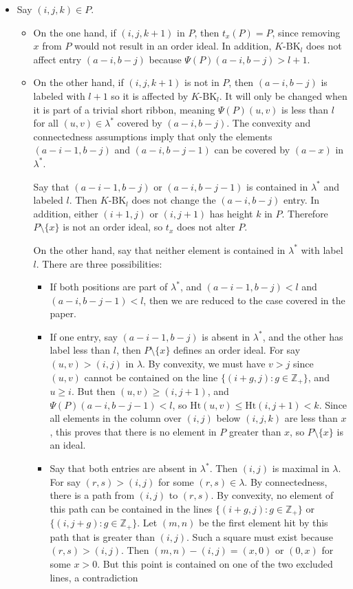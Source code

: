 \documentclass[10pt,letter]{article}
\begin{document}
\begin{itemize}
\item Say $(i,j,k) \in P$. 
\begin{itemize}
\item On the one hand, if $(i,j,k+1)$ in $P$, then $t_x(P) = P$, since removing $x$ from $P$ would not result in an order ideal. In addition, $K$-$\text{BK}_l$ does not affect entry $(a-i,b-j)$ because $\Psi(P)(a-i,b-j) > l + 1$. 

\item On the other hand, if $(i,j,k+1)$ is not in $P$, then $(a-i,b-j)$ is labeled with $l+1$ so it is affected by $K$-$\text{BK}_l$.  It will only be changed when it is part of a trivial short ribbon, meaning $\Psi(P)(u,v)$ is less than $l$ for all $(u,v) \in \lambda^{\ast}$ covered by $(a-i,b-j)$. The convexity and connectedness assumptions imply that only the elements $(a-i-1,b-j)$ and $(a-i,b-j-1)$ can be covered by $(a-x)$ in $\lambda^{\ast}$.

Say that $(a-i-1,b-j)$ or $(a-i,b-j-1)$ is contained in $\lambda^{\ast}$ and labeled $l$. Then $K$-$\text{BK}_l$ does not change the $(a-i,b-j)$ entry. In addition, either $(i+1,j)$ or  $(i,j+1)$  has height $k$ in $P$. Therefore $P \setminus \lbrace x \rbrace$ is not an order ideal, so $t_x$ does not alter $P$. 

On the other hand, say that neither element is contained in $\lambda^{\ast}$ with label $l$. There are three possibilities:
\begin{itemize}
\item If both positions are part of $\lambda^{\ast}$, and $(a-i-1,b-j) < l$ and $(a-i,b-j-1) < l$, then we are reduced to the case covered in the paper.

\item If one entry, say $(a-i-1,b-j)$ is absent in $\lambda^{\ast}$, and the other has label less than $l$, then $P \setminus \lbrace x \rbrace$ defines an order ideal. For say $(u,v) > (i,j)$ in $\lambda$. By convexity, we must have $v > j$ since $(u,v)$ cannot be contained on the line $\lbrace (i+g,j): g \in \mathbb{Z}_+ \rbrace$, and $u \geq i$. But then $(u,v) \geq (i,j+1)$, and $\Psi(P)(a-i,b-j-1) < l$, so $\text{Ht}(u,v) \leq \text{Ht}(i,j+1) < k$. Since all elements in the column over $(i,j)$ below $(i,j,k)$ are less than $x$, this proves that there is no element in $P$ greater than $x$, so $P \setminus \lbrace x \rbrace$ is an ideal. 


\item Say that both entries are absent in $\lambda^{\ast}$. Then $(i,j)$ is maximal in $\lambda$. For say $(r,s) > (i,j)$ for some $(r,s) \in \lambda$. By connectedness, there is a path from $(i,j)$ to $(r,s)$. By convexity, no element of this path can be contained in the lines $\lbrace (i+g,j): g \in \mathbb{Z}_+ \rbrace$ or  $\lbrace (i,j+g): g \in \mathbb{Z}_+ \rbrace$. Let $(m,n)$ be the first element hit by this path that is greater than $(i,j)$. Such a square must exist because $(r,s) > (i,j)$. Then $(m,n) - (i,j) = (x,0)$ or $(0,x)$ for some $x > 0$. But this point is contained on one of the two excluded lines, a contradiction
\end{itemize}


\end{itemize}
\end{itemize}
\end{document}
